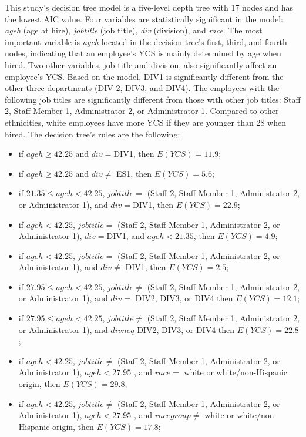 This study's decision tree model is a five-level depth tree with 17 nodes and has the lowest AIC value. Four variables are statistically significant in the model: \textit{ageh} (age at hire), \textit{jobtitle} (job title), \textit{div} (division), and \textit{race}. The most important variable is \textit{ageh} located in the decision tree's first, third, and fourth nodes, indicating that an employee's YCS is mainly determined by age when hired. Two other variables, job title and division, also significantly affect an employee's YCS. Based on the model, DIV1 is significantly different from the other three departments (DIV 2, DIV3, and DIV4). The employees with the following job titles are significantly different from those with other job titles: Staff 2, Staff Member 1, Administrator 2, or Administrator 1. Compared to other ethnicities, white employees have more YCS if they are younger than 28 when hired. The decision tree's rules are the following:
\begin{itemize}
	\item if $ageh \ge 42.25 $ and $div=$DIV1, then  $E(YCS)=11.9$;
	\item if $ageh \ge  42.25$ and $div\neq$ ES1, then $E(YCS)=5.6$;
	\item if $21.35 \le ageh < 42.25$, $job title =$ (Staff 2, Staff Member 1, Administrator 2, or Administrator 1), and $div= $DIV1, then $E(YCS)=22.9$;
	\item if $ageh < 42.25$, $job title =$ (Staff 2, Staff Member 1, Administrator 2, or Administrator 1), $div= $DIV1, and $ageh < 21.35$, then $E(YCS)=4.9$;
	\item if $ageh < 42.25$, $job title =$ (Staff 2, Staff Member 1, Administrator 2, or Administrator 1), and $div\neq$ DIV1, then $E(YCS)=2.5$;
	\item if $27.95 \le ageh < 42.25$, $job title \neq $ (Staff 2, Staff Member 1, Administrator 2, or Administrator 1), and $div=$ DIV2, DIV3, or DIV4 then $E(YCS)=12.1$;
	\item if $27.95 \le ageh < 42.25$, $job title \neq $ (Staff 2, Staff Member 1, Administrator 2, or Administrator 1), and $div neq$ DIV2, DIV3, or DIV4 then $E(YCS)=22.8$;
	\item if $ ageh < 42.25 $, $job title \neq $ (Staff 2, Staff Member 1, Administrator 2, or Administrator 1), $ageh<27.95$ , and $race=$ white or white/non-Hispanic origin, then $E(YCS)=29.8$;
	\item if $ ageh < 42.25 $, $job title \neq $ (Staff 2, Staff Member 1, Administrator 2, or Administrator 1), $ageh<27.95$ , and $racegroup\neq$ white or white/non-Hispanic origin, then $E(YCS)=17.8$;
	
\end{itemize}
